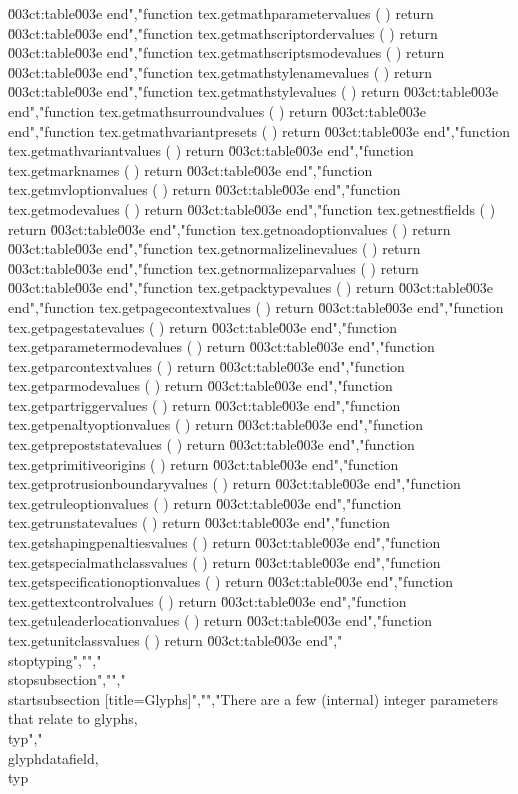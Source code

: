 \u003ct:table\u003e end","function tex.getmathparametervalues       ( ) return \u003ct:table\u003e end","function tex.getmathscriptordervalues     ( ) return \u003ct:table\u003e end","function tex.getmathscriptsmodevalues     ( ) return \u003ct:table\u003e end","function tex.getmathstylenamevalues       ( ) return \u003ct:table\u003e end","function tex.getmathstylevalues           ( ) return \u003ct:table\u003e end","function tex.getmathsurroundvalues        ( ) return \u003ct:table\u003e end","function tex.getmathvariantpresets        ( ) return \u003ct:table\u003e end","function tex.getmathvariantvalues         ( ) return \u003ct:table\u003e end","function tex.getmarknames                 ( ) return \u003ct:table\u003e end","function tex.getmvloptionvalues           ( ) return \u003ct:table\u003e end","function tex.getmodevalues                ( ) return \u003ct:table\u003e end","function tex.getnestfields                ( ) return \u003ct:table\u003e end","function tex.getnoadoptionvalues          ( ) return \u003ct:table\u003e end","function tex.getnormalizelinevalues       ( ) return \u003ct:table\u003e end","function tex.getnormalizeparvalues        ( ) return \u003ct:table\u003e end","function tex.getpacktypevalues            ( ) return \u003ct:table\u003e end","function tex.getpagecontextvalues         ( ) return \u003ct:table\u003e end","function tex.getpagestatevalues           ( ) return \u003ct:table\u003e end","function tex.getparametermodevalues       ( ) return \u003ct:table\u003e end","function tex.getparcontextvalues          ( ) return \u003ct:table\u003e end","function tex.getparmodevalues             ( ) return \u003ct:table\u003e end","function tex.getpartriggervalues          ( ) return \u003ct:table\u003e end","function tex.getpenaltyoptionvalues       ( ) return \u003ct:table\u003e end","function tex.getprepoststatevalues        ( ) return \u003ct:table\u003e end","function tex.getprimitiveorigins          ( ) return \u003ct:table\u003e end","function tex.getprotrusionboundaryvalues  ( ) return \u003ct:table\u003e end","function tex.getruleoptionvalues          ( ) return \u003ct:table\u003e end","function tex.getrunstatevalues            ( ) return \u003ct:table\u003e end","function tex.getshapingpenaltiesvalues    ( ) return \u003ct:table\u003e end","function tex.getspecialmathclassvalues    ( ) return \u003ct:table\u003e end","function tex.getspecificationoptionvalues ( ) return \u003ct:table\u003e end","function tex.gettextcontrolvalues         ( ) return \u003ct:table\u003e end","function tex.getuleaderlocationvalues     ( ) return \u003ct:table\u003e end","function tex.getunitclassvalues           ( ) return \u003ct:table\u003e end","\\stoptyping","","\\stopsubsection","","\\startsubsection [title={Glyphs}]","","There are a few (internal) integer parameters that relate to glyphs, \\typ","{\\glyphdatafield}, \\typ 